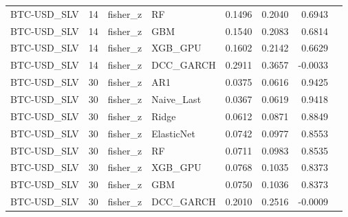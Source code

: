 \begin{table}[H]
\begin{tabular}{llllrrrr}
BTC-USD_SLV & 14 & fisher_z & RF & 0.1496 & 0.2040 & 0.6943 &  \\
BTC-USD_SLV & 14 & fisher_z & GBM & 0.1540 & 0.2083 & 0.6814 &  \\
BTC-USD_SLV & 14 & fisher_z & XGB_GPU & 0.1602 & 0.2142 & 0.6629 &  \\
BTC-USD_SLV & 14 & fisher_z & DCC_GARCH & 0.2911 & 0.3657 & -0.0033 &  \\
BTC-USD_SLV & 30 & fisher_z & AR1 & 0.0375 & 0.0616 & 0.9425 &  \\
BTC-USD_SLV & 30 & fisher_z & Naive_Last & 0.0367 & 0.0619 & 0.9418 &  \\
BTC-USD_SLV & 30 & fisher_z & Ridge & 0.0612 & 0.0871 & 0.8849 &  \\
BTC-USD_SLV & 30 & fisher_z & ElasticNet & 0.0742 & 0.0977 & 0.8553 &  \\
BTC-USD_SLV & 30 & fisher_z & RF & 0.0711 & 0.0983 & 0.8535 &  \\
BTC-USD_SLV & 30 & fisher_z & XGB_GPU & 0.0768 & 0.1035 & 0.8373 &  \\
BTC-USD_SLV & 30 & fisher_z & GBM & 0.0750 & 0.1036 & 0.8373 &  \\
BTC-USD_SLV & 30 & fisher_z & DCC_GARCH & 0.2010 & 0.2516 & -0.0009 &  \\
\bottomrule
\end{tabular}
\end{table}